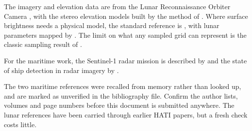 \documentclass[11pt]{article}
\begin{document}
The imagery and elevation data are from the Lunar Reconnaissance Orbiter Camera
\autocite{robinson2010}, with the stereo elevation models built by the method of
\textcite{henriksen2017}. Where surface brightness needs a physical model, the standard
reference is \textcite{hapke1984}, with lunar parameters mapped by
\textcite{sato2014}. The limit on what any sampled grid can represent is the classic
sampling result of \textcite{shannon1949}.

For the maritime work, the Sentinel-1 radar mission is described by
\textcite{torres2012} and the state of ship detection in radar imagery by
\textcite{crisp2004}.

\begin{limitbox}
The two maritime references were recalled from memory rather than looked up, and are
marked as unverified in the bibliography file. Confirm the author lists, volumes and
page numbers before this document is submitted anywhere. The lunar references have been
carried through earlier HATI papers, but a fresh check costs little.
\end{limitbox}

\printbibliography[title={References}]
\end{document}
